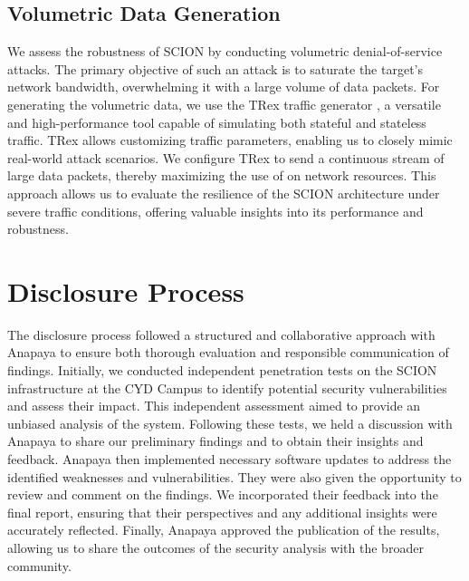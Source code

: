 \subsection{Volumetric Data Generation}
We assess the robustness of SCION by conducting volumetric denial-of-service attacks.
The primary objective of such an attack is to saturate the target's network bandwidth, overwhelming it with a large volume of data packets.
For generating the volumetric data, we use the TRex traffic generator \cite{trexWebsite}, a versatile and high-performance tool capable of simulating both stateful and stateless traffic.
TRex allows customizing traffic parameters, enabling us to closely mimic real-world attack scenarios.
We configure TRex to send a continuous stream of large data packets, thereby maximizing the use of on network resources.
This approach allows us to evaluate the resilience of the SCION architecture under severe traffic conditions, offering valuable insights into its performance and robustness.

\section{Disclosure Process}
\label{sec:methodology:disclosure}

The disclosure process followed a structured and collaborative approach with Anapaya to ensure both thorough evaluation and responsible communication of findings.
Initially, we conducted independent penetration tests on the SCION infrastructure at the CYD Campus to identify potential security vulnerabilities and assess their impact.
This independent assessment aimed to provide an unbiased analysis of the system.
Following these tests, we held a discussion with Anapaya to share our preliminary findings and to obtain their insights and feedback.
Anapaya then implemented necessary software updates to address the identified weaknesses and vulnerabilities.
They were also given the opportunity to review and comment on the findings.
We incorporated their feedback into the final report, ensuring that their perspectives and any additional insights were accurately reflected.
Finally, Anapaya approved the publication of the results, allowing us to share the outcomes of the security analysis with the broader community.

